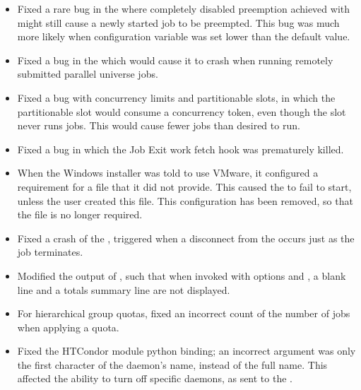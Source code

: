 \begin{itemize}

\item Fixed a rare bug in the  where 
completely disabled preemption achieved with
might still cause a newly started job to be preempted.  
This bug was much more likely when
configuration variable  was set lower 
than the default value.

\item Fixed a bug in the  which would cause it
to crash when running remotely submitted parallel universe jobs.

\item Fixed a bug with concurrency limits and partitionable slots,
in which the partitionable slot would consume a concurrency token,
even though the slot never runs jobs.  This would cause fewer jobs
than desired to run.

\item Fixed a bug in which the Job Exit work fetch hook was prematurely killed.

\item When the Windows installer was told to use VMware,
it configured a requirement for a 
 file that it did not provide.
This caused the  to fail to start,
unless the user created this file.
This configuration has been removed, so that the file is no longer required. 

\item Fixed a crash of the , triggered when a disconnect
from the  occurs just as the job terminates.

\item Modified the output of ,
such that when invoked with options  and ,
a blank line and a totals summary line are not displayed.

\item For hierarchical group quotas, 
fixed an incorrect count of the number of jobs when applying a quota.

\item Fixed the HTCondor module  python binding;
an incorrect argument was only the first character of the daemon's name,
instead of the full name. 
This affected the ability to turn off specific daemons,
as sent to the .


\end{itemize}
